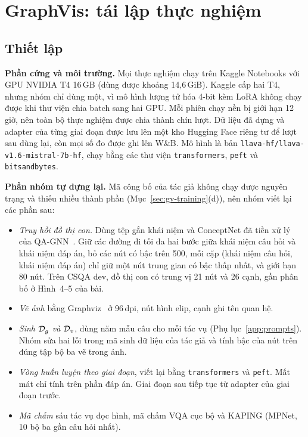 \section{GraphVis: tái lập thực nghiệm}\label{sec:gv-repro}
\subsection{Thiết lập}
\textbf{Phần cứng và môi trường.} Mọi thực nghiệm chạy trên Kaggle Notebooks với GPU NVIDIA T4 16\,GB (dùng được khoảng 14,6\,GiB). Kaggle cấp hai T4, nhưng nhóm chỉ dùng một, vì mô hình lượng tử hóa 4-bit kèm LoRA không chạy được khi thư viện chia batch sang hai GPU. Mỗi phiên chạy nền bị giới hạn 12 giờ, nên toàn bộ thực nghiệm được chia thành chín lượt. Dữ liệu đã dựng và adapter của từng giai đoạn được lưu lên một kho Hugging Face riêng tư để lượt sau dùng lại, còn mọi số đo được ghi lên W\&B. Mô hình là bản \texttt{llava-hf/llava-v1.6-mistral-7b-hf}, chạy bằng các thư viện \texttt{transformers}, \texttt{peft} và \texttt{bitsandbytes}.

\textbf{Phần nhóm tự dựng lại.} Mã công bố của tác giả không chạy được nguyên trạng và thiếu nhiều thành phần (Mục~\ref{sec:gv-training}(d)), nên nhóm viết lại các phần sau:
\begin{itemize}
\item \emph{Truy hồi đồ thị con.} Dùng tệp gắn khái niệm và ConceptNet đã tiền xử lý của QA-GNN~\cite{yasunaga2021qagnn}. Giữ các đường đi tối đa hai bước giữa khái niệm câu hỏi và khái niệm đáp án, bỏ các nút có bậc trên 500, mỗi cặp (khái niệm câu hỏi, khái niệm đáp án) chỉ giữ một nút trung gian có bậc thấp nhất, và giới hạn 80 nút. Trên CSQA dev, đồ thị con có trung vị 21 nút và 26 cạnh, gần phân bố ở Hình~4--5 của bài.
\item \emph{Vẽ ảnh} bằng Graphviz~\cite{gansner2000graphviz} ở 96\,dpi, nút hình elip, cạnh ghi tên quan hệ.
\item \emph{Sinh $\mathcal{D}_g$ và $\mathcal{D}_v$}, dùng năm mẫu câu cho mỗi tác vụ (Phụ lục~\ref{app:prompts}). Nhóm sửa hai lỗi trong mã sinh dữ liệu của tác giả và tính bậc của nút trên đúng tập bộ ba vẽ trong ảnh.
\item \emph{Vòng huấn luyện theo giai đoạn}, viết lại bằng \texttt{transformers} và \texttt{peft}. Mất mát chỉ tính trên phần đáp án. Giai đoạn sau tiếp tục từ adapter của giai đoạn trước.
\item \emph{Mã chấm} sáu tác vụ đọc hình, mã chấm VQA cục bộ và KAPING (MPNet, 10 bộ ba gần câu hỏi nhất).
\end{itemize}

